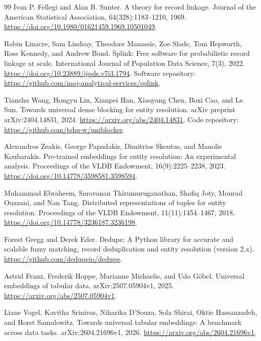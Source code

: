 \documentclass[11pt]{article}
\begin{document}
\begin{thebibliography}{99}
Ivan P. Fellegi and Alan B. Sunter.
\newblock A theory for record linkage.
\newblock Journal of the American Statistical Association, 64(328):1183--1210, 1969.
\newblock \url{https://doi.org/10.1080/01621459.1969.10501049}.

Robin Linacre, Sam Lindsay, Theodore Manassis, Zoe Slade, Tom Hepworth, Ross Kennedy, and Andrew Bond.
\newblock Splink: Free software for probabilistic record linkage at scale.
\newblock International Journal of Population Data Science, 7(3), 2022.
\newblock \url{https://doi.org/10.23889/ijpds.v7i3.1794}.
\newblock Software repository: \url{https://github.com/moj-analytical-services/splink}.

Tianshu Wang, Hongyu Lin, Xianpei Han, Xiaoyang Chen, Boxi Cao, and Le Sun.
\newblock Towards universal dense blocking for entity resolution.
\newblock arXiv preprint arXiv:2404.14831, 2024.
\newblock \url{https://arxiv.org/abs/2404.14831}.
\newblock Code repository: \url{https://github.com/tshu-w/uniblocker}.

Alexandros Zeakis, George Papadakis, Dimitrios Skoutas, and Manolis Koubarakis.
\newblock Pre-trained embeddings for entity resolution: An experimental analysis.
\newblock Proceedings of the VLDB Endowment, 16(9):2225--2238, 2023.
\newblock \url{https://doi.org/10.14778/3598581.3598594}.

Muhammad Ebraheem, Saravanan Thirumuruganathan, Shafiq Joty, Mourad Ouzzani, and Nan Tang.
\newblock Distributed representations of tuples for entity resolution.
\newblock Proceedings of the VLDB Endowment, 11(11):1454--1467, 2018.
\newblock \url{https://doi.org/10.14778/3236187.3236198}.

Forest Gregg and Derek Eder.
\newblock Dedupe: A Python library for accurate and scalable fuzzy matching, record deduplication and entity resolution (version 2.x).
\newblock \url{https://github.com/dedupeio/dedupe}.

Astrid Franz, Frederik Hoppe, Marianne Michaelis, and Udo G\"obel.
\newblock Universal embeddings of tabular data.
\newblock arXiv:2507.05904v1, 2025.
\newblock \url{https://arxiv.org/abs/2507.05904v1}.

Liane Vogel, Kavitha Srinivas, Niharika D'Souza, Sola Shirai, Oktie Hassanzadeh, and Horst Samulowitz.
\newblock Towards universal tabular embeddings: A benchmark across data tasks.
\newblock arXiv:2604.21696v1, 2026.
\newblock \url{https://arxiv.org/abs/2604.21696v1}.


\end{thebibliography}
\end{document}
